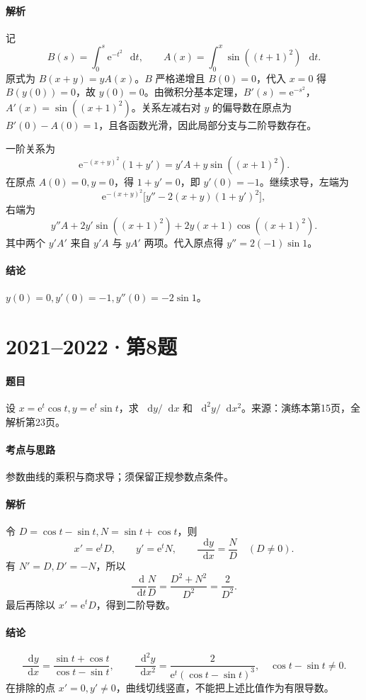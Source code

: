 \documentclass[UTF8,fontset=fandol,12pt,oneside,openany]{ctexrep}
\newcommand{\dd}{\mathop{}\!\mathrm d}
\newcommand{\ee}{\mathrm e}
\theoremstyle{definition}
\begin{document}
\paragraph{解析}记
\[
 B(s)=\int_0^s\ee^{-t^2}\,\dd t,\qquad
 A(x)=\int_0^x\sin((t+1)^2)\,\dd t.
\]
原式为 $B(x+y)=yA(x)$。$B$ 严格递增且 $B(0)=0$，代入 $x=0$ 得 $B(y(0))=0$，故 $y(0)=0$。由微积分基本定理，$B'(s)=\ee^{-s^2}$，$A'(x)=\sin((x+1)^2)$。关系左减右对 $y$ 的偏导数在原点为 $B'(0)-A(0)=1$，且各函数光滑，因此局部分支与二阶导数存在。

一阶关系为
\[
 \ee^{-(x+y)^2}(1+y')=y'A+y\sin((x+1)^2).
\]
在原点 $A(0)=0,y=0$，得 $1+y'=0$，即 $y'(0)=-1$。继续求导，左端为
\[
 \ee^{-(x+y)^2}\big[y''-2(x+y)(1+y')^2\big],
\]
右端为
\[
 y''A+2y'\sin((x+1)^2)+2y(x+1)\cos((x+1)^2).
\]
其中两个 $y'A'$ 来自 $y'A$ 与 $yA'$ 两项。代入原点得 $y''=2(-1)\sin1$。
\paragraph{结论}$y(0)=0,y'(0)=-1,y''(0)=-2\sin1$。

\par\addvspace{18pt}\noindent\begin{minipage}{\linewidth}
\section{2021--2022·第8题}
\paragraph{题目}设 $x=\ee^t\cos t,y=\ee^t\sin t$，求 $\dd y/\dd x$ 和 $\dd^2y/\dd x^2$。来源：演练本第15页，全解析第23页。
\end{minipage}\par
\paragraph{考点与思路}参数曲线的乘积与商求导；须保留正规参数点条件。
\paragraph{解析}令 $D=\cos t-\sin t,N=\sin t+\cos t$，则
\[
 x'=\ee^tD,\qquad y'=\ee^tN,
 \qquad \frac{\dd y}{\dd x}=\frac ND\quad(D\ne0).
\]
有 $N'=D,D'=-N$，所以
\[
 \frac{\dd}{\dd t}\frac ND=\frac{D^2+N^2}{D^2}=\frac2{D^2}.
\]
最后再除以 $x'=\ee^tD$，得到二阶导数。
\paragraph{结论}
\[
 \frac{\dd y}{\dd x}=\frac{\sin t+\cos t}{\cos t-\sin t},\qquad
 \frac{\dd^2y}{\dd x^2}=\frac2{\ee^t(\cos t-\sin t)^3},
 \quad\cos t-\sin t\ne0.
\]
在排除的点 $x'=0,y'\ne0$，曲线切线竖直，不能把上述比值作为有限导数。
\end{document}

